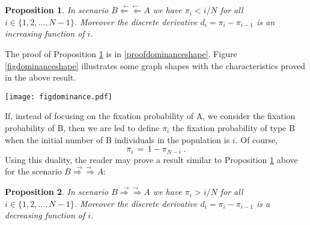 \documentclass[12pt]{article}
\newtheorem{proposition}{Proposition}
\begin{document}
\begin{proposition}   \label{dominanceshape}
	In scenario $B\stackrel{\leftarrow \leftarrow}{\Leftarrow \Leftarrow} A$ we have $\pi_i<i/N$ for all $i \in \{1, 2, \dots, N-1\}$. Moreover the discrete derivative $d_i=\pi_i-\pi_{i-1}$ is an increasing function of $i$.
\end{proposition}
The proof of Proposition \ref{dominanceshape} is in \ref{proofdominanceshape}.  Figure \ref{figdominanceshape} illustrates some graph shapes with the characteristics proved in the above result.
\begin{figure*}
	\texttt{[image: figdominance.pdf]}
      \caption{Plot of the fixation probability of A as a function of the initial fraction $i/N$ of A individuals in the population for two values of the population size. The neutral case graph $\pi_i=i/N$ is shown for comparison. The pay-off matrix elements are $a=	1$, $b=1.1$, $c=1.1$ and $d=1.2$  and the selection intensity is $w=1$. For both values $N=50$ and $N=100$ it is easy to check that $r_1<1$ and $r_{N-1}<1$. From the graphs it is seen that conditions $\rho_A<1/N$ and $\rho_B>1/N$ are fulfilled, so that the evolutionary scenario is $B\stackrel{\leftarrow \leftarrow}{\Leftarrow \Leftarrow} A$.}
      \label{figdominanceshape}
\end{figure*}


If, instead of focusing on the fixation probability of A, we consider the fixation probability of B, then we are led to define $\overline{\pi}_i$ the fixation probability of type B when the initial number of B individuals in the population is $i$. Of course, 
\begin{equation}  \label{pibar}
\overline{\pi}_i \,=\, 1-\pi_{N-i} \;.
\end{equation}
Using this duality, the reader may prove a result similar to Proposition \ref{dominanceshape} above for the scenario $B\stackrel{\rightarrow \rightarrow}{\Rightarrow \Rightarrow} A$:
\begin{proposition}   \label{dualdominanceshape}
	In scenario $B\stackrel{\rightarrow \rightarrow}{\Rightarrow \Rightarrow} A$ we have $\pi_i>i/N$ for all $i \in \{1, 2, \dots, N-1\}$. Moreover the discrete derivative $d_i=\pi_i-\pi_{i-1}$ is a decreasing function of $i$.
\end{proposition}
\end{document}
